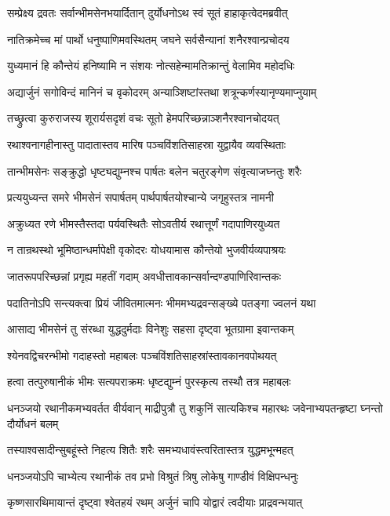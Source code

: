 \twolineshloka
{सम्प्रेक्ष्य द्रवतः सर्वान्भीमसेनभयार्दितान्}
{दुर्योधनोऽथ स्वं सूतं हाहाकृत्वेदमब्रवीत्}


\twolineshloka
{नातिक्रमेच्च मां पार्थो धनुष्पाणिमवस्थितम्}
{जघने सर्वसैन्यानां शनैरश्वान्प्रचोदय}


\twolineshloka
{युध्यमानं हि कौन्तेयं हनिष्यामि न संशयः}
{नोत्सहेन्मामतिक्रान्तुं वेलामिव महोदधिः}


\twolineshloka
{अद्यार्जुनं सगोविन्दं मानिनं च वृकोदरम्}
{अन्याञ्शिष्टांस्तथा शत्रून्कर्णस्यानृण्यमाप्नुयाम्}


\twolineshloka
{तच्छ्रुत्वा कुरुराजस्य शूरार्यसदृशं वचः}
{सूतो हेमपरिच्छन्नाञ्शनैरश्वानचोदयत्}


\twolineshloka
{रथाश्वनागहीनास्तु पादातास्तव मारिष}
{पञ्चविंशतिसाहस्रा युद्वायैव व्यवस्थिताः}


\twolineshloka
{तान्भीमसेनः सङ्क्रुद्धो धृष्ट्यद्युम्नश्च पार्षतः}
{बलेन चतुरङ्गेण संवृत्याजघ्नतुः शरैः}


\twolineshloka
{प्रत्ययुध्यन्त समरे भीमसेनं सपार्षतम्}
{पार्थपार्षतयोश्चान्ये जगृहुस्तत्र नामनी}


\twolineshloka
{अक्रुध्यत रणे भीमस्तैस्तदा पर्यवस्थितैः}
{सोऽवतीर्य रथात्तूर्णं गदापाणिरयुध्यत}


\twolineshloka
{न तान्रथस्थो भूमिष्ठान्धर्मापेक्षी वृकोदरः}
{योधयामास कौन्तेयो भुजवीर्यव्यपाश्रयः}


\twolineshloka
{जातरूपपरिच्छन्नां प्रगृह्य महतीं गदाम्}
{अवधीत्तावकान्सर्वान्दण्डपाणिरिवान्तकः}


\twolineshloka
{पदातिनोऽपि सन्त्यक्त्वा प्रियं जीवितमात्मनः}
{भीममभ्यद्रवन्सङ्ख्ये पतङ्गा ज्वलनं यथा}


\twolineshloka
{आसाद्य भीमसेनं तु संरब्धा युद्धदुर्मदाः}
{विनेशुः सहसा दृष्ट्वा भूतग्रामा इवान्तकम्}


\twolineshloka
{श्येनवद्विचरन्भीमो गदाहस्तो महाबलः}
{पञ्चविंशतिसाहस्रांस्तावकानवपोथयत्}


\twolineshloka
{हत्वा तत्पुरुषानीकं भीमः सत्यपराक्रमः}
{धृष्टद्युम्नं पुरस्कृत्य तस्थौ तत्र महाबलः}


\threelineshloka
{धनञ्जयो रथानीकमभ्यवर्तत वीर्यवान्}
{माद्रीपुत्रौ तु शकुनिं सात्यकिश्च महारथः}
{जवेनाभ्यपतन्हृष्टा घ्नन्तो दौर्योधनं बलम्}


\twolineshloka
{तस्याश्वसादीन्सुबहूंस्ते निहत्य शितैः शरैः}
{समभ्यधावंस्त्वरितास्तत्र युद्धमभून्महत्}


\twolineshloka
{धनञ्जयोऽपि चाभ्येत्य रथानीकं तव प्रभो}
{विश्रुतं त्रिषु लोकेषु गाण्डीवं विक्षिपन्धनुः}


\twolineshloka
{कृष्णसारथिमायान्तं दृष्ट्वा श्वेतहयं रथम्}
{अर्जुनं चापि योद्वारं त्वदीयाः प्राद्रवन्भयात्}


